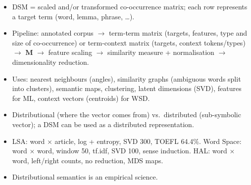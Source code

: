 \begin{nbsummary}
\begin{itemize}[nosep]
  \item DSM = scaled and/or transformed co-occurrence matrix; each row represents a
        target term (word, lemma, phrase, \ldots).
  \item Pipeline: annotated corpus $\to$ term-term matrix (targets, features, type and
        size of co-occurrence) or term-context matrix (targets, context tokens/types)
        $\to$ $\mathbf{M}$ $\to$ feature scaling $\to$ similarity measure +
        normalisation $\to$ dimensionality reduction.
  \item Uses: nearest neighbours (angles), similarity graphs (ambiguous words split
        into clusters), semantic maps, clustering, latent dimensions (SVD), features for
        ML, context vectors (centroids) for WSD.
  \item Distributional (where the vector comes from) vs.\ distributed (sub-symbolic
        vector); a DSM can be used as a distributed representation.
  \item LSA: word $\times$ article, log + entropy, SVD 300, TOEFL 64.4\%. Word Space:
        word $\times$ word, window 50, tf.idf, SVD 100, sense induction. HAL: word
        $\times$ word, left/right counts, no reduction, MDS maps.
  \item Distributional semantics is an empirical science.
\end{itemize}
\end{nbsummary}
